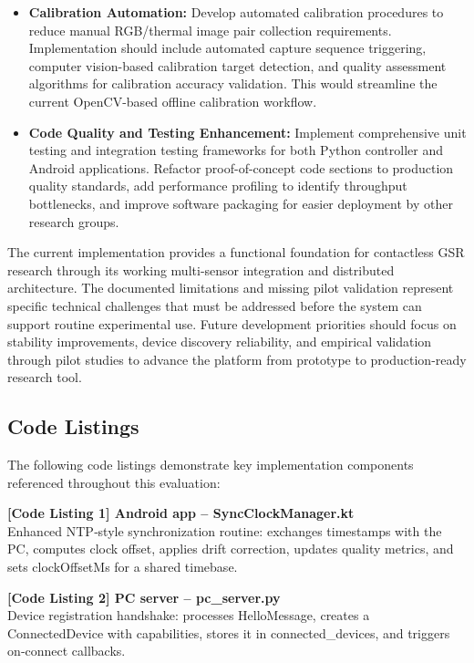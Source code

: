 \documentclass[12pt,a4paper]{article}
\begin{document}
\begin{itemize}
\item
  \textbf{Calibration Automation:} Develop automated calibration procedures to reduce manual RGB/thermal image pair collection requirements. Implementation should include automated capture sequence triggering, computer vision-based calibration target detection, and quality assessment algorithms for calibration accuracy validation. This would streamline the current OpenCV-based offline calibration workflow.
\item
  \textbf{Code Quality and Testing Enhancement:} Implement comprehensive unit testing and integration testing frameworks for both Python controller and Android applications. Refactor proof-of-concept code sections to production quality standards, add performance profiling to identify throughput bottlenecks, and improve software packaging for easier deployment by other research groups.
\end{itemize}

The current implementation provides a functional foundation for contactless GSR research through its working multi-sensor integration and distributed architecture. The documented limitations and missing pilot validation represent specific technical challenges that must be addressed before the system can support routine experimental use. Future development priorities should focus on stability improvements, device discovery reliability, and empirical validation through pilot studies to advance the platform from prototype to production-ready research tool.

\subsection{Code Listings}\label{code-listings-1}

The following code listings demonstrate key implementation components referenced throughout this evaluation:

\textbf{{[}Code Listing 1{]} Android app -- SyncClockManager.kt}\\
Enhanced NTP‑style synchronization routine: exchanges timestamps with the PC, computes clock offset, applies drift correction, updates quality metrics, and sets clockOffsetMs for a shared timebase.

\textbf{{[}Code Listing 2{]} PC server -- pc\_server.py}\\
Device registration handshake: processes HelloMessage, creates a ConnectedDevice with capabilities, stores it in connected\_devices, and triggers on‑connect callbacks.
\end{document}
